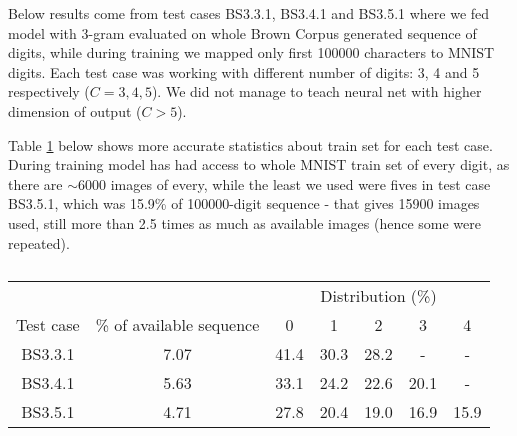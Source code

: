 \documentclass[shortabstract,lic,english]{iithesis}
\begin{document}
Below results come from test cases BS3.3.1, BS3.4.1 and BS3.5.1 where we fed model with 3-gram evaluated on whole Brown Corpus generated sequence of digits, while during training we mapped only first 100000 characters to MNIST digits. Each test case was working with different number of digits: 3, 4 and 5 respectively ($C=3, 4, 5$). We did not manage to teach neural net with higher dimension of output ($C > 5$).

Table \ref{tab:tbs3(345)1_stats} below shows more accurate statistics about train set for each test case. During training model has had access to whole MNIST train set of every digit, as there are $\sim6000$ images of every, while the least we used were fives in test case BS3.5.1, which was 15.9\% of 100000-digit sequence - that gives 15900 images used, still more than 2.5 times as much as available images (hence some were repeated).

\begin{table}[htbp]
\centering
\begin{tabular}{c|c|c|c|c|c|c|}
    \multicolumn{2}{c}{} & \multicolumn{5}{|c|}{Distribution (\%)} \\
    \cline{3-7}
    Test case & \% of available sequence & 0 & 1 & 2 & 3 & 4 \\
    \hline
    BS3.3.1 & 7.07 & 41.4 & 30.3 & 28.2 & - & - \\
    BS3.4.1 & 5.63 & 33.1 & 24.2 & 22.6 & 20.1 & - \\
    BS3.5.1 & 4.71 & 27.8 & 20.4 & 19.0 & 16.9 & 15.9 \\
\end{tabular}
\caption{}
\label{tab:tbs3(345)1_stats}
\end{table}
\end{document}
